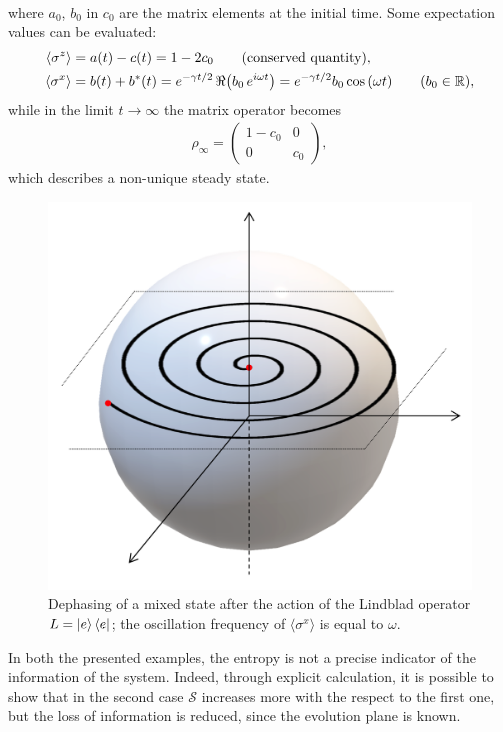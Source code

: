 \begin{tcolorbox} 
\begin{align*}
\end{align*}
where $a_0$, $b_0$ in $c_0$ are the matrix elements at the initial time. Some expectation values can be evaluated:
\begin{align*}
    \langle \sigma^z \rangle &= a(t) - c(t) = 1 - 2 c_0 \qquad (\text{conserved quantity}), \\
    \langle \sigma^x \rangle &= b(t) + b^*(t) = e^{-\gamma t /2} \, \real{\left(b_0 \, e^{i \omega t }\right)} = e^{-\gamma t /2} b_0 \cos{(\omega t)}  \qquad (b_0 \in \mathbb{R}),
\end{align*}
while in the limit $t \to \infty$ the matrix operator becomes
\begin{align*}
    \rho_\infty = \begin{pmatrix} 1-c_0 & 0 \\ 0 & c_0 \end{pmatrix},
\end{align*}
which describes a non-unique steady state. 
\end{tcolorbox}

\begin{figure}[H]
\centering
\includegraphics[width=0.47\linewidth]{images/Dephasing.png}
    \caption{Dephasing of a mixed state after the action of the Lindblad operator $L = \ket{e}\bra{e}$; the oscillation frequency of $\langle \sigma^x \rangle$ is equal to $\omega$.}
    \label{fig:dephasing}
\end{figure}

In both the presented examples, the entropy is not a precise indicator of the information of the system. Indeed, through explicit calculation, it is possible to show that in the second case $\mathcal{S}$ increases more with the respect to the first one, but the loss of information is reduced, since the evolution plane is known. 

